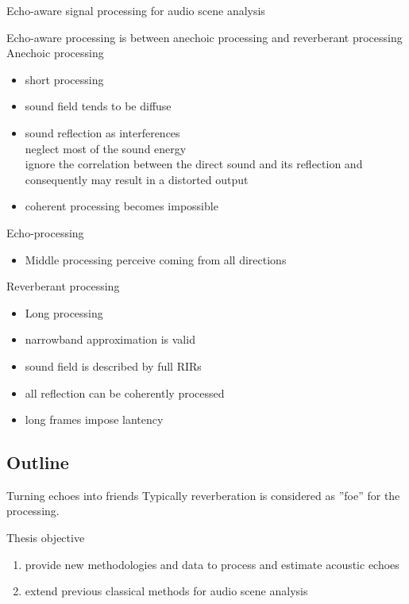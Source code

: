 \begin{frame}{\alert{Echo-aware} signal processing for audio scene analysis}
    \begin{block}{Echo-aware processing}
        is between anechoic processing and reverberant processing
        \\Anechoic processing
        \begin{itemize}
            \item short processing
            \item[\cmark] sound field tends to be diffuse
            \item[\xmark] sound reflection as interferences
            \\neglect most of the sound energy
            \\ignore the correlation between the direct sound and its reflection and consequently may result in a distorted output
            \item[\xmark] coherent processing becomes impossible
        \end{itemize}
        Echo-processing
        \begin{itemize}
            \item Middle processing
            perceive coming from all directions~\cite{daldegan1988}
        \end{itemize}
        Reverberant processing
        \begin{itemize}
            \item Long processing
            \item[\cmark] narrowband approximation is valid
            \item[\cmark] sound field is described by full RIRs
            \item[\cmark] all reflection can be \alert{coherently} processed
            \item[\xmark] long frames impose lantency
        \end{itemize}
    \end{block}

\end{frame}

\subsection{Outline}

\begin{frame}
    \begin{block}{Turning echoes into friends}
        Typically reverberation is considered as ''foe'' for the processing.
    \end{block}

    \begin{mydefblock}{Thesis objective}
        \begin{enumerate}
        \item provide new methodologies and data to process and estimate acoustic echoes
            \item extend previous classical methods for audio scene analysis
        \end{enumerate}
    \end{mydefblock}

\end{frame}

